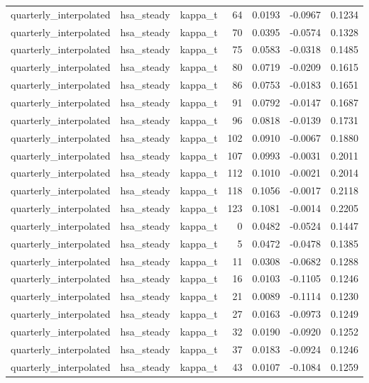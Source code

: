 \begin{tabular}{lllrrrr}
quarterly\_interpolated & hsa\_steady & kappa\_t & 64 & 0.0193 & -0.0967 & 0.1234 \\
quarterly\_interpolated & hsa\_steady & kappa\_t & 70 & 0.0395 & -0.0574 & 0.1328 \\
quarterly\_interpolated & hsa\_steady & kappa\_t & 75 & 0.0583 & -0.0318 & 0.1485 \\
quarterly\_interpolated & hsa\_steady & kappa\_t & 80 & 0.0719 & -0.0209 & 0.1615 \\
quarterly\_interpolated & hsa\_steady & kappa\_t & 86 & 0.0753 & -0.0183 & 0.1651 \\
quarterly\_interpolated & hsa\_steady & kappa\_t & 91 & 0.0792 & -0.0147 & 0.1687 \\
quarterly\_interpolated & hsa\_steady & kappa\_t & 96 & 0.0818 & -0.0139 & 0.1731 \\
quarterly\_interpolated & hsa\_steady & kappa\_t & 102 & 0.0910 & -0.0067 & 0.1880 \\
quarterly\_interpolated & hsa\_steady & kappa\_t & 107 & 0.0993 & -0.0031 & 0.2011 \\
quarterly\_interpolated & hsa\_steady & kappa\_t & 112 & 0.1010 & -0.0021 & 0.2014 \\
quarterly\_interpolated & hsa\_steady & kappa\_t & 118 & 0.1056 & -0.0017 & 0.2118 \\
quarterly\_interpolated & hsa\_steady & kappa\_t & 123 & 0.1081 & -0.0014 & 0.2205 \\
quarterly\_interpolated & hsa\_steady & kappa\_t & 0 & 0.0482 & -0.0524 & 0.1447 \\
quarterly\_interpolated & hsa\_steady & kappa\_t & 5 & 0.0472 & -0.0478 & 0.1385 \\
quarterly\_interpolated & hsa\_steady & kappa\_t & 11 & 0.0308 & -0.0682 & 0.1288 \\
quarterly\_interpolated & hsa\_steady & kappa\_t & 16 & 0.0103 & -0.1105 & 0.1246 \\
quarterly\_interpolated & hsa\_steady & kappa\_t & 21 & 0.0089 & -0.1114 & 0.1230 \\
quarterly\_interpolated & hsa\_steady & kappa\_t & 27 & 0.0163 & -0.0973 & 0.1249 \\
quarterly\_interpolated & hsa\_steady & kappa\_t & 32 & 0.0190 & -0.0920 & 0.1252 \\
quarterly\_interpolated & hsa\_steady & kappa\_t & 37 & 0.0183 & -0.0924 & 0.1246 \\
quarterly\_interpolated & hsa\_steady & kappa\_t & 43 & 0.0107 & -0.1084 & 0.1259 \\

\end{tabular}
